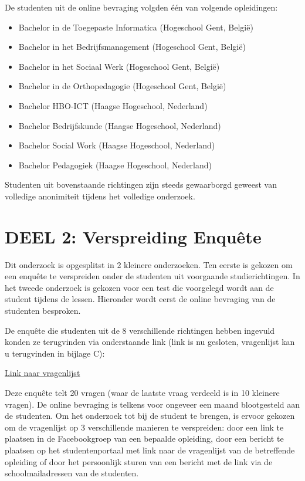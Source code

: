 De studenten uit de online bevraging volgden één van volgende opleidingen:
\begin{itemize}
\item Bachelor in de Toegepaste Informatica (Hogeschool Gent, België)
\item Bachelor in het Bedrijfsmanagement (Hogeschool Gent, België)
\item Bachelor in het Sociaal Werk (Hogeschool Gent, België)
\item Bachelor in de Orthopedagogie (Hogeschool Gent, België)

\item Bachelor HBO-ICT (Haagse Hogeschool, Nederland)
\item Bachelor Bedrijfskunde (Haagse Hogeschool, Nederland)
\item Bachelor Social Work (Haagse Hogeschool, Nederland)
\item Bachelor Pedagogiek (Haagse Hogeschool, Nederland)
\end{itemize}

Studenten uit bovenstaande richtingen zijn steeds gewaarborgd geweest van volledige anonimiteit tijdens het volledige onderzoek. 

\section{DEEL 2: Verspreiding Enquête}
\label{sec:enquete}

Dit onderzoek is opgesplitst in 2 kleinere onderzoeken. Ten eerste is gekozen om een enquête te verspreiden onder de studenten uit voorgaande studierichtingen. In het tweede onderzoek is gekozen voor een test die voorgelegd wordt aan de student tijdens de lessen. Hieronder wordt eerst de online bevraging van de studenten besproken.

De enquête die studenten uit de 8 verschillende richtingen hebben ingevuld konden ze terugvinden via onderstaande link (link is nu gesloten, vragenlijst kan u terugvinden in bijlage C):

\href{https://forms.office.com/Pages/ResponsePage.aspx?id=DjH3XBoJxUus1ybHIdTMzaq6IAIJ5OtInh7h0Z9qRNVUMTJRV1E1MzUzN0RSVkRPUExUUzEzNk1HVC4u}{Link naar vragenlijst}

Deze enquête telt 20 vragen (waar de laatste vraag verdeeld is in 10 kleinere vragen). De online bevraging is telkens voor ongeveer een maand blootgesteld aan de studenten. Om het onderzoek tot bij de student te brengen, is ervoor gekozen om de vragenlijst op 3 verschillende manieren te verspreiden: door een link te plaatsen in de Facebookgroep van een bepaalde opleiding, door een bericht te plaatsen op het studentenportaal met link naar de vragenlijst van de betreffende opleiding of door het persoonlijk sturen van een bericht met de link via de schoolmailadressen van de studenten.

